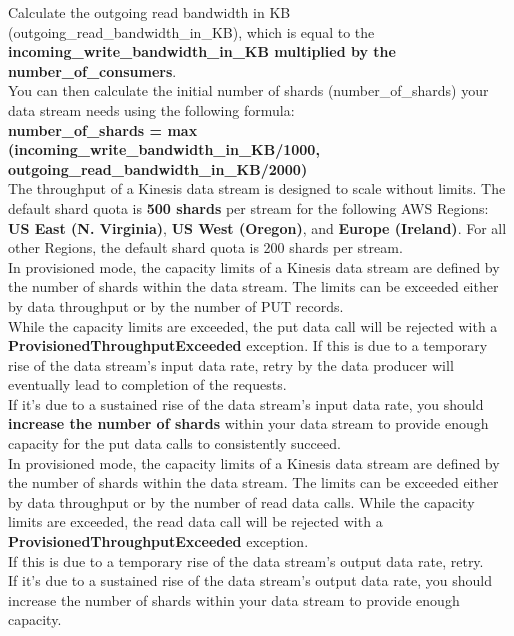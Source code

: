\documentclass[12pt, letterpaper, twoside]{article}
\begin{document}
Calculate the outgoing read bandwidth in KB (outgoing\_read\_bandwidth\_in\_KB), which is equal to the 
\textbf{incoming\_write\_bandwidth\_in\_KB multiplied by the number\_of\_consumers}.\\

You can then calculate the initial number of shards (number\_of\_shards) your data stream needs using the following formula:\\ 
\textbf{number\_of\_shards = max (incoming\_write\_bandwidth\_in\_KB/1000, outgoing\_read\_bandwidth\_in\_KB/2000)}\\

The throughput of a Kinesis data stream is designed to scale without limits. The default shard quota is \textbf{500 shards} per stream 
for the following AWS Regions: \textbf{US East (N. Virginia)}, \textbf{US West (Oregon)}, and \textbf{Europe (Ireland)}.
For all other Regions, the default shard quota is 200 shards per stream.\\

In provisioned mode, the capacity limits of a Kinesis data stream are defined by the number of shards within the data stream. 
The limits can be exceeded either by data throughput or by the number of PUT records.\\
While the capacity limits are exceeded, the put data call will be rejected with a \textbf{ProvisionedThroughputExceeded} exception. 
If this is due to a temporary rise of the data stream’s input data rate, retry by the data producer will eventually lead to completion 
of the requests.\\
If it’s due to a sustained rise of the data stream’s input data rate, you should \textbf{increase the number of shards} within your data 
stream to provide enough capacity for the put data calls to consistently succeed.\\

In provisioned mode, the capacity limits of a Kinesis data stream are defined by the number of shards within the data stream. The limits 
can be exceeded either by data throughput or by the number of read data calls. While the capacity limits are exceeded, the read data call 
will be rejected with a \textbf{ProvisionedThroughputExceeded} exception.\\
If this is due to a temporary rise of the data stream’s output data rate, retry.\\
If it’s due to a sustained rise of the data stream’s output data rate, you should increase the number of shards within your data stream to 
provide enough capacity.\\
\end{document}
